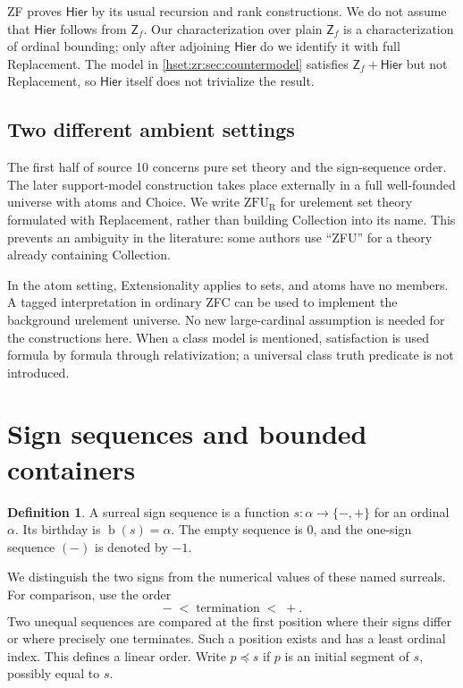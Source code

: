 \documentclass[11pt,letterpaper]{article}
\theoremstyle{definition}
\newtheorem{definition}[definition]{Definition}\aliascntresetthe{definition}
\theoremstyle{remark}
\newcommand{\bd}{\operatorname{b}}
\newcommand{\Zf}{\mathsf{Z}_{\!f}}
\newcommand{\Hier}{\mathsf{Hier}}
\newcommand{\ZFUR}{\mathrm{ZFU}_{\mathrm R}}
\newcommand{\signs}{\{-,+\}}
\newcommand{\pref}{\preccurlyeq}
\begin{document}
ZF proves $\Hier$ by its usual recursion and rank constructions. We do not assume that $\Hier$ follows from $\Zf$. Our characterization over plain $\Zf$ is a characterization of ordinal bounding; only after adjoining $\Hier$ do we identify it with full Replacement. The model in \cref{hset:zr:sec:countermodel} satisfies $\Zf+\Hier$ but not Replacement, so $\Hier$ itself does not trivialize the result.

\subsection{Two different ambient settings}
The first half of source 10 concerns pure set theory and the sign-sequence order. The later support-model construction takes place externally in a full well-founded universe with atoms and Choice. We write $\ZFUR$ for urelement set theory formulated with Replacement, rather than building Collection into its name. This prevents an ambiguity in the literature: some authors use ``ZFU'' for a theory already containing Collection.

In the atom setting, Extensionality applies to sets, and atoms have no members. A tagged interpretation in ordinary ZFC can be used to implement the background urelement universe. No new large-cardinal assumption is needed for the constructions here. When a class model is mentioned, satisfaction is used formula by formula through relativization; a universal class truth predicate is not introduced.

\section{Sign sequences and bounded containers}
\label{hset:zr:sec:signs}

\begin{definition}
A surreal sign sequence is a function $s:\alpha\to\signs$ for an ordinal $\alpha$. Its birthday is $\bd(s)=\alpha$. The empty sequence is $0$, and the one-sign sequence $(-)$ is denoted by $-1$.
\end{definition}
We distinguish the two signs from the numerical values of these named surreals. For comparison, use the order
\[
-\;<\;\text{termination}\;<\;+.
\]
Two unequal sequences are compared at the first position where their signs differ or where precisely one terminates. Such a position exists and has a least ordinal index. This defines a linear order. Write $p\pref s$ if $p$ is an initial segment of $s$, possibly equal to $s$.
\end{document}
